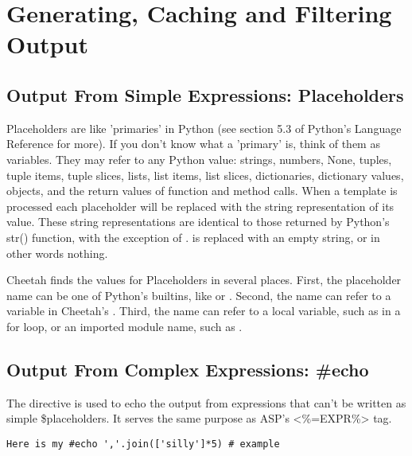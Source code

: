 \section{Generating, Caching and Filtering Output}
\label{output}

\subsection{Output From Simple Expressions: Placeholders}
\label{TDL.placeholders}

Placeholders are like 'primaries' in Python (see section 5.3 of Python's
Language Reference for more). If you don't know what a 'primary' is, think of
them as variables. They may refer to any Python value: strings, numbers, None,
tuples, tuple items, tuple slices, lists, list items, list slices, dictionaries,
dictionary values, objects, and the return values of function and method calls.
When a template is processed each placeholder will be replaced with the string
representation of its value.  These string representations are identical to
those returned by Python's str() function, with the exception of .
 is replaced with an empty string, or in other words nothing.

Cheetah finds the values for Placeholders in several places.  First, the
placeholder name can be one of Python's builtins, like  or
.  Second, the name can refer to a variable in Cheetah's
.  Third, the name can refer to a local variable, such as
 in a for loop, or an imported module name, such as .

\subsection{Output From Complex Expressions: \#echo}
\label{TDL.echo}

The  directive is used to echo the output from expressions that
can't be written as simple \$placeholders.  It serves the same purpose as ASP's
<\%=EXPR\%> tag.

\begin{verbatim}
Here is my #echo ','.join(['silly']*5) # example 
\end{verbatim}

